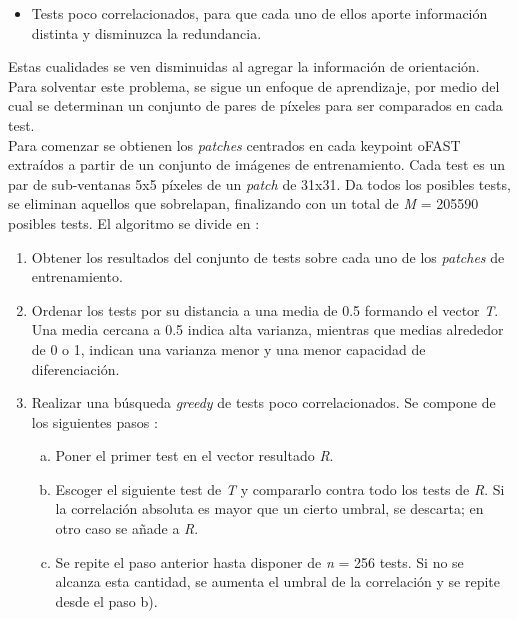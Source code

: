 \begin{subsection}
\begin{subsection}
\begin{subsection}
\begin{itemize}
\item Tests poco correlacionados, para que cada uno de ellos aporte información distinta y disminuzca la redundancia.

\end{itemize}

Estas cualidades se ven disminuidas al agregar la información de orientación. Para solventar este problema, se sigue un enfoque de aprendizaje, por medio del cual se determinan un conjunto de pares de píxeles para ser comparados en cada test. \\
Para comenzar se obtienen los \textit{\textsl{patches}} centrados en cada keypoint oFAST extraídos a partir de un conjunto de imágenes de entrenamiento. Cada test es un par de sub-ventanas 5x5 píxeles de un \textit{\textsl{patch}} de 31x31. Da todos los posibles tests, se eliminan aquellos que sobrelapan, finalizando con un total de \textsl{M} = 205590 posibles tests.
El algoritmo se divide en : 

\begin{enumerate}

\item Obtener los resultados del conjunto de tests sobre cada uno de los \textit{\textsl{patches}} de entrenamiento.

\item Ordenar los tests por su distancia a una media de 0.5 formando el vector \textsl{T}. Una media cercana a 0.5 indica alta varianza, mientras que medias alrededor de 0 o 1, indican una varianza menor y una menor capacidad de diferenciación.

\item Realizar una búsqueda \textsl{greedy} de tests poco correlacionados. Se compone de los siguientes pasos : 
\begin{enumerate} [a)]
\item Poner el primer test en el vector resultado \textsl{R}.

\item Escoger el siguiente test de \textsl{T} y compararlo contra todo los tests de \textsl{R}. Si la correlación absoluta es mayor que un cierto umbral, se descarta; en otro caso se añade a \textsl{R}.

\item Se repite el paso anterior hasta disponer de \textsl{n} = 256 tests. Si no se alcanza esta cantidad, se aumenta el umbral de la correlación y se repite desde el paso b).
\end{enumerate}


\end{enumerate}
\end{subsection}
\end{subsection}
\end{subsection}
